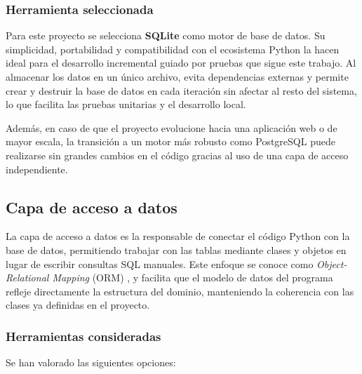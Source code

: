 \subsubsection{Herramienta seleccionada}
Para este proyecto se selecciona \textbf{SQLite} como motor de base de datos.  
Su simplicidad, portabilidad y compatibilidad con el ecosistema Python la hacen ideal para el desarrollo incremental
guiado por pruebas que sigue este trabajo. Al almacenar los datos en un único archivo, evita dependencias externas
y permite crear y destruir la base de datos en cada iteración sin afectar al resto del sistema, lo que facilita las
pruebas unitarias y el desarrollo local.

Además, en caso de que el proyecto evolucione hacia una aplicación web o de mayor escala, la transición a un motor
más robusto como PostgreSQL puede realizarse sin grandes cambios en el código gracias al uso de una capa de acceso
independiente.

\subsection{Capa de acceso a datos}
La capa de acceso a datos es la responsable de conectar el código Python con la base de datos, permitiendo trabajar 
con las tablas mediante clases y objetos en lugar de escribir consultas SQL manuales. Este enfoque se conoce como 
\textit{Object-Relational Mapping} (ORM) \cite{fowlerPatterns}, y facilita que el modelo de datos del programa 
refleje directamente la estructura del dominio, manteniendo la coherencia con las clases ya definidas en el proyecto.

\subsubsection{Herramientas consideradas}
Se han valorado las siguientes opciones:

